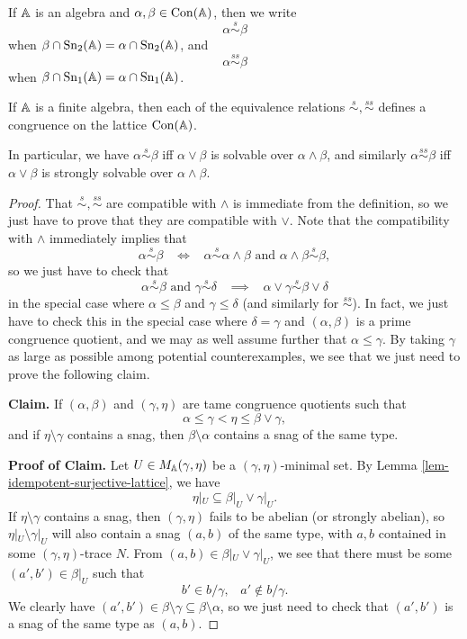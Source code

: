 \begin{appendices}
\begin{defn} If $\mathbb{A}$ is an algebra and $\alpha, \beta \in \operatorname{Con}(\mathbb{A})$, then we write
\[
\alpha \stackrel{s}{\sim} \beta
\]
when $\beta \cap \operatorname{Sn}_2(\mathbb{A}) = \alpha \cap \operatorname{Sn}_2(\mathbb{A})$, and
\[
\alpha \stackrel{ss}{\sim} \beta
\]
when $\beta \cap \operatorname{Sn}_1(\mathbb{A}) = \alpha \cap \operatorname{Sn}_1(\mathbb{A})$.
\end{defn}

\begin{thm}\label{thm-locally-solvable-congruence} If $\mathbb{A}$ is a finite algebra, then each of the equivalence relations $\stackrel{s}{\sim}, \stackrel{ss}{\sim}$ defines a congruence on the lattice $\operatorname{Con}(\mathbb{A})$.

In particular, we have $\alpha \stackrel{s}{\sim} \beta$ iff $\alpha \vee \beta$ is solvable over $\alpha \wedge \beta$, and similarly $\alpha \stackrel{ss}{\sim} \beta$ iff $\alpha \vee \beta$ is strongly solvable over $\alpha \wedge \beta$.
\end{thm}
\begin{proof} That $\stackrel{s}{\sim}, \stackrel{ss}{\sim}$ are compatible with $\wedge$ is immediate from the definition, so we just have to prove that they are compatible with $\vee$. Note that the compatibility with $\wedge$ immediately implies that
\[
\alpha \stackrel{s}{\sim} \beta \;\;\; \iff \;\;\; \alpha \stackrel{s}{\sim} \alpha \wedge \beta \text{ and } \alpha \wedge \beta \stackrel{s}{\sim} \beta,
\]
so we just have to check that
\[
\alpha \stackrel{s}{\sim} \beta \text{ and } \gamma \stackrel{s}{\sim} \delta \;\;\; \implies \;\;\; \alpha \vee \gamma \stackrel{s}{\sim} \beta \vee \delta
\]
in the special case where $\alpha \le \beta$ and $\gamma \le \delta$ (and similarly for $\stackrel{ss}{\sim}$). In fact, we just have to check this in the special case where $\delta = \gamma$ and $(\alpha,\beta)$ is a prime congruence quotient, and we may as well assume further that $\alpha \le \gamma$. By taking $\gamma$ as large as possible among potential counterexamples, we see that we just need to prove the following claim.

{\bf Claim.} If $(\alpha, \beta)$ and $(\gamma, \eta)$ are tame congruence quotients such that
\[
\alpha \le \gamma < \eta \le \beta \vee \gamma,
\]
and if $\eta \setminus \gamma$ contains a snag, then $\beta \setminus \alpha$ contains a snag of the same type.

{\bf Proof of Claim.} Let $U \in M_{\mathbb{A}}(\gamma, \eta)$ be a $(\gamma, \eta)$-minimal set. By Lemma \ref{lem-idempotent-surjective-lattice}, we have
\[
\eta|_U \subseteq \beta|_U \vee \gamma|_U.
\]
If $\eta \setminus \gamma$ contains a snag, then $(\gamma, \eta)$ fails to be abelian (or strongly abelian), so $\eta|_U \setminus \gamma|_U$ will also contain a snag $(a,b)$ of the same type, with $a,b$ contained in some $(\gamma, \eta)$-trace $N$. From $(a,b) \in \beta|_U \vee \gamma|_U$, we see that there must be some $(a', b') \in \beta|_U$ such that
\[
b' \in b/\gamma, \;\;\; a' \not\in b/\gamma.
\]
We clearly have $(a',b') \in \beta \setminus \gamma \subseteq \beta \setminus \alpha$, so we just need to check that $(a',b')$ is a snag of the same type as $(a,b)$.


\end{proof}
\end{appendices}
